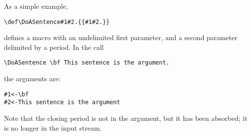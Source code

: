 \documentclass[letterpaper]{book}
\begin{document}
As a simple example,
\begin{verbatim}
\def\DoASentence#1#2.{{#1#2.}}
\end{verbatim}
defines a macro with an undelimited first parameter,
and a second parameter delimited by a period.
In the call
\begin{verbatim}
\DoASentence \bf This sentence is the argument.
\end{verbatim}
the arguments are:
\begin{verbatim}
#1<-\bf
#2<-This sentence is the argument
\end{verbatim}
Note that the closing period is not in the argument, but it has
been absorbed; it is no longer in the input stream.

\end{document}
